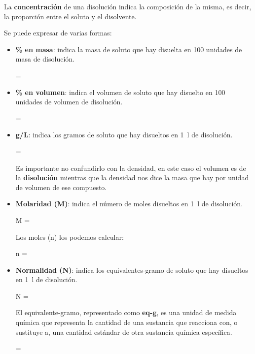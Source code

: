 \begin{definition}[Concentración]
    La \textbf{concentración} de una disolución indica la composición de la misma, es decir, la proporción entre el soluto y el disolvente.
\end{definition}
Se puede expresar de varias formas:
\begin{itemize}
    \item \textbf{\% en masa}: indica la masa de soluto que hay disuelta en 100 unidades de masa de disolución.
    \begin{centeredequation}
         =  
    \end{centeredequation}
    \item \textbf{\% en volumen}: indica el volumen de soluto que hay disuelto en 100 unidades de volumen de disolución.
    \begin{centeredequation}
         =  
    \end{centeredequation}
    \item \textbf{g/L}: indica los gramos de soluto que hay disueltos en \qty{1}{\litre} de disolución.
    \begin{centeredequation}
         = 
    \end{centeredequation}
    \begin{remark}
        Es importante no confundirlo con la densidad, en este caso el volumen es de la \textbf{disolución} mientras que la densidad nos dice la masa que hay por unidad de volumen de ese compuesto.
    \end{remark}
    \item \textbf{Molaridad (M)}: indica el número de moles disueltos en \qty{1}{\litre} de disolución.
    \begin{centeredequation}
        M = 
    \end{centeredequation}
    Los moles (n) los podemos calcular:
    \begin{centeredequation}
        n = 
    \end{centeredequation}
    \item \textbf{Normalidad (N)}: indica los equivalentes-gramo de soluto que hay disueltos en \qty{1}{\litre} de disolución.
    \begin{centeredequation}
        N = 
    \end{centeredequation}
    El equivalente-gramo, representado como \textbf{eq-g}, es una unidad de medida química que representa la cantidad de una sustancia que reacciona con, o sustituye a, una cantidad estándar de otra sustancia química específica.
    \begin{centeredequation}
         = 
    \end{centeredequation}


\end{itemize}
